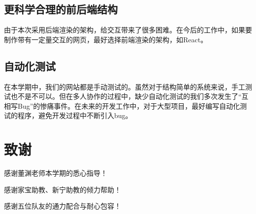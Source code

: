 \documentclass[a4paper,12pt]{article}
\begin{document}
    \subsection{更科学合理的前后端结构} %
    \label{sub:更科学合理的前后端结构}
    由于本次采用后端渲染的架构，给交互带来了很多困难。在今后的工作中，如果要制作带有一定量交互的网页，最好选择前端渲染的架构，如React。
    \subsection{自动化测试} %
    \label{sub:自动化测试}
    在本学期中，我们的网站都是手动测试的。虽然对于结构简单的系统来说，手工测试也不是不可以。但在多人协作的过程中，缺少自动化测试的我们多次发生了“互相写Bug”的惨痛事件。在未来的开发工作中，对于大型项目，最好编写自动化测试的程序，避免开发过程中不断引入bug。
    \section{致谢} %
    \label{sec:致谢}
    感谢董渊老师本学期的悉心指导！

    感谢家宝助教、新宁助教的倾力帮助！

    感谢五位队友的通力配合与耐心包容！
    \label{applastpage}
    \newpage
\iffalse
\begin{itemize}[noitemsep,topsep=0pt]
\end{itemize}
\begin{enumerate}[label=\Roman{*}.,noitemsep,topsep=0pt]
\end{enumerate}
\begin{multicols}{2}
\end{multicols}
\fi
\end{document}
